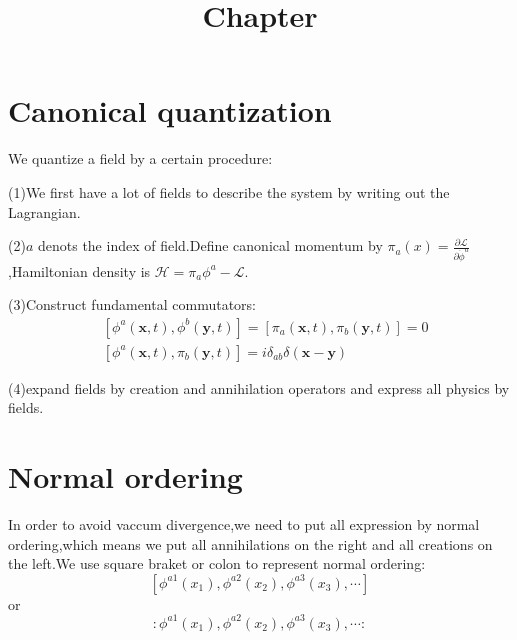 \documentclass[a4paper]{article}
\begin{document}
	\title{Chapter}
	\date{ }
	\maketitle
\section{Canonical quantization}
We quantize a field by a certain procedure:
\par (1)We first have a lot of fields to describe the system by writing out the Lagrangian.
\par (2)$a$ denots the index of field.Define canonical momentum by $\pi_a(x)=\frac{\partial \mathscr{L}}{\partial\dot{\phi}^a}$,Hamiltonian density is $\mathscr{H}=\pi_a \phi^a-\mathscr{L}$.
\par (3)Construct fundamental commutators:
\begin{align*}
	&[\phi^a(\bm{x},t),\phi^b(\bm{y},t)]=[\pi_a(\bm{x},t),\pi_b(\bm{y},t)]=0\\&[\phi^a(\bm{x},t),\pi_b(\bm{y},t)]=i\delta_{ab}\delta(\bm{x}-\bm{y})
\end{align*}
\par (4)expand fields by creation and annihilation operators and express all physics by fields.
\section{Normal ordering}
In order to avoid vaccum divergence,we need to put all expression by normal ordering,which means we put all annihilations on the right and all creations on the left.We use square braket or colon to represent normal ordering:$$[\phi^{a1}(x_1),\phi^{a2}(x_2),\phi^{a3}(x_3),\cdots]$$or$$:\phi^{a1}(x_1),\phi^{a2}(x_2),\phi^{a3}(x_3),\cdots:$$
\end{document}
